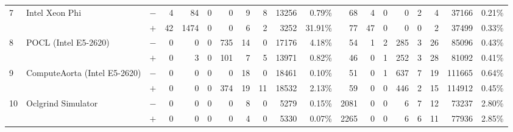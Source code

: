 \begin{tabular}{lll | rrrrrrrr | rrrrrrrr }
\hline
\multirow{ 2}{*}{7} & \multirow{ 2}{*}{Intel Xeon Phi} & $-$ & 4 & 84 & 0 & 0 & 9 & 8 & 13256 & 0.79\%       & 68 & 4 & 0 & 0 & 2 & 4 & 37166 & 0.21\% \\& & $+$ & 42 & 1474 & 0 & 0 & 6 & 2 & 3252 & 31.91\% & 77 & 47 & 0 & 0 & 0 & 2 & 37499 & 0.33\% \\
\hline
\multirow{ 2}{*}{8} & \multirow{ 2}{*}{POCL (Intel E5-2620)} & $-$ & 0 & 0 & 0 & 735 & 14 & 0 & 17176 & 4.18\%       & 54 & 1 & 2 & 285 & 3 & 26 & 85096 & 0.43\% \\& & $+$ & 0 & 3 & 0 & 101 & 7 & 5 & 13971 & 0.82\% & 46 & 0 & 1 & 252 & 3 & 28 & 81092 & 0.41\% \\
\hline
\multirow{ 2}{*}{9} & \multirow{ 2}{*}{ComputeAorta (Intel E5-2620)} & $-$ & 0 & 0 & 0 & 0 & 18 & 0 & 18461 & 0.10\%       & 51 & 0 & 1 & 637 & 7 & 19 & 111665 & 0.64\% \\& & $+$ & 0 & 0 & 0 & 374 & 19 & 11 & 18532 & 2.13\% & 59 & 0 & 0 & 446 & 2 & 15 & 114912 & 0.45\% \\
\hline
\multirow{ 2}{*}{10} & \multirow{ 2}{*}{Oclgrind Simulator} & $-$ & 0 & 0 & 0 & 0 & 8 & 0 & 5279 & 0.15\%       & 2081 & 0 & 0 & 6 & 7 & 12 & 73237 & 2.80\% \\& & $+$ & 0 & 0 & 0 & 0 & 4 & 0 & 5330 & 0.07\% & 2265 & 0 & 0 & 6 & 6 & 11 & 77936 & 2.85\% \\
  \bottomrule
\end{tabular}

